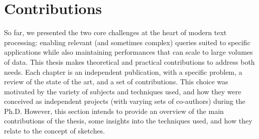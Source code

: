  \section{Contributions}\label{intro:sec:contrib}


So far, we presented the two core challenges at the heart of modern text processing: enabling relevant (and sometimes complex) queries suited to specific applications while also maintaining performances that can scale to large volumes of data.
%
This thesis makes theoretical and practical contributions to address both needs. 
Each chapter is  an independent publication, with a specific problem, a review of the state of the art, and a set of contributions. This choice was motivated by the variety of subjects and techniques used, and how they were conceived as independent projects (with varying sets of co-authors) during the Ph.D. However, this section intends to provide an overview of the main contributions of the thesis, some insights into the techniques used, and how they relate to the concept of sketches.



